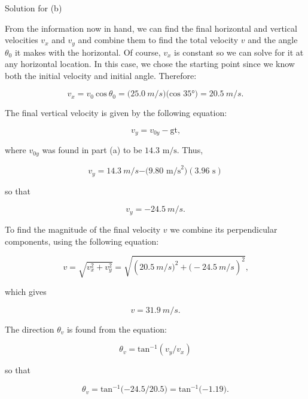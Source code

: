 \documentclass[
]{book}
\newenvironment{tinysection}{}{}
\begin{document}
\begin{tinysection}

{Solution for (b)}

\end{tinysection}

From the information now in hand, we can find the final horizontal and
vertical velocities \(v_{x}{}\) and \(v_{y}{}\) and combine them to find the
total velocity \(v{}\) and the angle \(\theta_{0}{}\) it makes with the
horizontal. Of course, \(v_{x}{}\) is constant so we can solve for it at
any horizontal location. In this case, we chose the starting point since
we know both the initial velocity and initial angle. Therefore:

\leavevmode\hypertarget{eip-873}{}%
\[{{v_{x} = v_{0}}\ \text{cos}\ {\theta_{0} = (}\text{25}\text{.}0\ m/s)(\text{cos\ 35°}{) = \text{20}}\text{.}5\ m/s.}{}\]

The final vertical velocity is given by the following equation:

\leavevmode\hypertarget{eip-168}{}%
\[{v_{y} = {v_{0y} - \text{gt,}}}{}\]

where \(v_{0y}{}\) was found in part (a) to be
\({\text{14}\text{.}\text{3~m/s}}{}\). Thus,

\leavevmode\hypertarget{eip-113}{}%
\[{{v_{y} = \text{14}}\text{.}3\ m/s{- (}9\text{.}\text{80\ m/s}^{2})(3\text{.}\text{96\ s})}{}\]

so that

\leavevmode\hypertarget{eip-571}{}%
\[{{v_{y} = {- \text{24}}}\text{.}5\ m/s.}{}\]

To find the magnitude of the final velocity \(v{}\) we combine its
perpendicular components, using the following equation:

\leavevmode\hypertarget{eip-394}{}%
\[{{v = \sqrt{v_{x}^{2} + v_{y}^{2}}} = \sqrt{(\text{20}\text{.}5\ m/s{{)^{2} + (} - \text{24}}\text{.}5\ m/s)^{2}}\text{,}}{}\]

which gives

\leavevmode\hypertarget{eip-60}{}%
\[{{v = \text{31}}\text{.}9\ m/s.}{}\]

The direction \(\theta_{v}{}\) is found from the equation:

\leavevmode\hypertarget{eip-353}{}%
\[{{\theta_{v} = \text{tan}^{- 1}}({v_{y}/v_{x}})}{}\]

so that

\leavevmode\hypertarget{eip-589}{}%
\[{{\theta_{v} = \text{tan}^{- 1}}{( - \text{24}}\text{.}{5/\text{20}}\text{.}5{) = \text{tan}^{- 1}}{( - 1}\text{.}\text{19})\text{.}}{}\]
\end{document}
